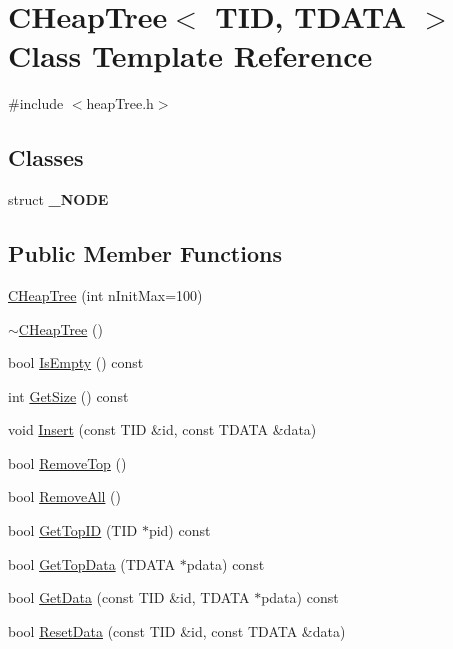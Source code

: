 \hypertarget{classCHeapTree}{
\section{CHeapTree$<$ TID, TDATA $>$ Class Template Reference}
\label{classCHeapTree}
}


{\ttfamily \#include $<$heapTree.h$>$}

\subsection*{Classes}
\begin{DoxyCompactItemize}
\item 
struct {\bfseries \_\-NODE}
\end{DoxyCompactItemize}
\subsection*{Public Member Functions}
\begin{DoxyCompactItemize}
\item 
\hyperlink{classCHeapTree_a69014f29dff41b8a994e9e22e155ff10}{CHeapTree} (int nInitMax=100)
\item 
\hyperlink{classCHeapTree_a376e2b94d5a1333a721eb6940f113202}{$\sim$CHeapTree} ()
\item 
bool \hyperlink{classCHeapTree_a832c197b6babfe4b094e4dd56959d3d5}{IsEmpty} () const 
\item 
int \hyperlink{classCHeapTree_a2fd838d2387b6ab096e0d24e311389f6}{GetSize} () const 
\item 
void \hyperlink{classCHeapTree_ab46d24bd33f9d97d120e62f2bf05be20}{Insert} (const TID \&id, const TDATA \&data)
\item 
bool \hyperlink{classCHeapTree_a7a6e130f6fb97782d01892f881efd901}{RemoveTop} ()
\item 
bool \hyperlink{classCHeapTree_a3c835d17270d03dc933faa4fb94c02fb}{RemoveAll} ()
\item 
bool \hyperlink{classCHeapTree_a6adf63dfbfeab2129421792963a798f7}{GetTopID} (TID $\ast$pid) const 
\item 
bool \hyperlink{classCHeapTree_ad2216b6199569bb3872b8881dbbd287c}{GetTopData} (TDATA $\ast$pdata) const 
\item 
bool \hyperlink{classCHeapTree_a93f174c44507c428d491eac76f9be18f}{GetData} (const TID \&id, TDATA $\ast$pdata) const 
\item 
bool \hyperlink{classCHeapTree_a4fed05db5fa97df8816bbebd1b73ed3b}{ResetData} (const TID \&id, const TDATA \&data)
\end{DoxyCompactItemize}
